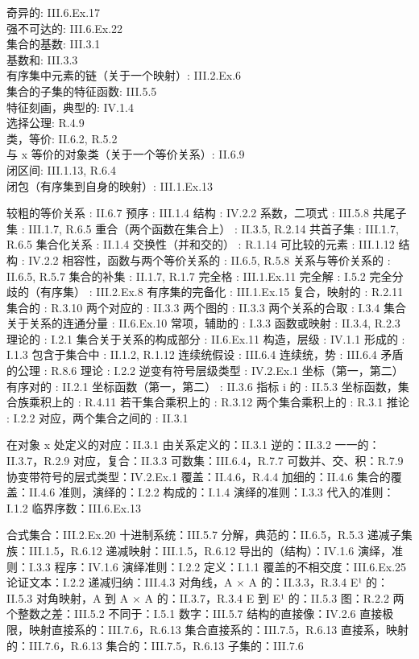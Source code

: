 奇异的: III.6.Ex.17\\
强不可达的: III.6.Ex.22\\
集合的基数: III.3.1\\
基数和: III.3.3\\
有序集中元素的链（关于一个映射）: III.2.Ex.6\\
集合的子集的特征函数: III.5.5\\
特征刻画，典型的: IV.1.4\\
选择公理: R.4.9\\
类，等价: II.6.2, R.5.2\\
与 x 等价的对象类（关于一个等价关系）: II.6.9\\
闭区间: III.1.13, R.6.4\\
闭包（有序集到自身的映射）: III.1.Ex.13

较粗的等价关系 : II.6.7 预序 : III.1.4 结构 : IV.2.2 系数，二项式 : III.5.8 共尾子集 : III.1.7, R.6.5 重合（两个函数在集合上） : II.3.5, R.2.14 共首子集 : III.1.7, R.6.5 集合化关系 : II.1.4 交换性（并和交的） : R.1.14 可比较的元素 : III.1.12 结构 : IV.2.2 相容性，函数与两个等价关系的 : II.6.5, R.5.8 关系与等价关系的 : II.6.5, R.5.7 集合的补集 : II.1.7, R.1.7 完全格 : III.1.Ex.11 完全解 : I.5.2 完全分歧的（有序集） : III.2.Ex.8 有序集的完备化 : III.1.Ex.15 复合，映射的 : R.2.11 集合的 : R.3.10 两个对应的 : II.3.3 两个图的 : II.3.3 两个关系的合取 : I.3.4 集合关于关系的连通分量 : II.6.Ex.10 常项，辅助的 : I.3.3 函数或映射 : II.3.4, R.2.3 理论的 : I.2.1 集合关于关系的构成部分 : II.6.Ex.11 构造，层级 : IV.1.1 形成的 : I.1.3 包含于集合中 : II.1.2, R.1.12 连续统假设 : III.6.4 连续统，势 : III.6.4 矛盾的公理 : R.8.6 理论 : I.2.2 逆变有符号层级类型 : IV.2.Ex.1 坐标（第一，第二）有序对的 : II.2.1 坐标函数（第一，第二） : II.3.6 指标 i 的 : II.5.3 坐标函数，集合族乘积上的 : R.4.11 若干集合乘积上的 : R.3.12 两个集合乘积上的 : R.3.1 推论 : I.2.2 对应，两个集合之间的 : II.3.1

在对象 x 处定义的对应：II.3.1 由关系定义的：II.3.1 逆的：II.3.2 一一的：II.3.7，R.2.9 对应，复合：II.3.3 可数集：III.6.4，R.7.7 可数并、交、积：R.7.9 协变带符号的层式类型：IV.2.Ex.1 覆盖：II.4.6，R.4.4 加细的：II.4.6 集合的覆盖：II.4.6 准则，演绎的：I.2.2 构成的：I.1.4 演绎的准则：I.3.3 代入的准则：I.1.2 临界序数：III.6.Ex.13

合式集合：III.2.Ex.20 十进制系统：III.5.7 分解，典范的：II.6.5，R.5.3 递减子集族：III.1.5，R.6.12 递减映射：III.1.5，R.6.12 导出的（结构）：IV.1.6 演绎，准则：I.3.3 程序：IV.1.6 演绎准则：I.2.2 定义：I.1.1 覆盖的不相交度：III.6.Ex.25 论证文本：I.2.2 递减归纳：III.4.3 对角线，A × A 的：II.3.3，R.3.4 E¹ 的：II.5.3 对角映射，A 到 A × A 的：II.3.7，R.3.4 E 到 E¹ 的：II.5.3 图：R.2.2 两个整数之差：III.5.2 不同于：I.5.1 数字：III.5.7 结构的直接像：IV.2.6 直接极限，映射直接系的：III.7.6，R.6.13 集合直接系的：III.7.5，R.6.13 直接系，映射的：III.7.6，R.6.13 集合的：III.7.5，R.6.13 子集的：III.7.6


